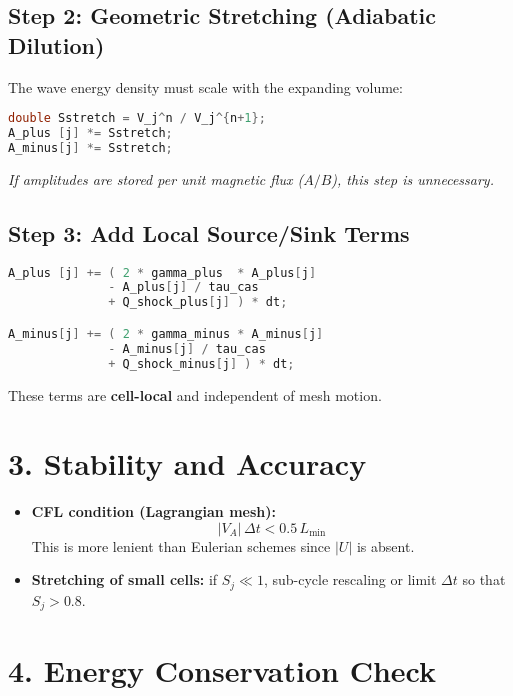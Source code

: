 \subsection*{Step 2: Geometric Stretching (Adiabatic Dilution)}

The wave energy density must scale with the expanding volume:
\begin{lstlisting}[language=C++,basicstyle=\ttfamily\footnotesize]
double Sstretch = V_j^n / V_j^{n+1};
A_plus [j] *= Sstretch;
A_minus[j] *= Sstretch;
\end{lstlisting}

\emph{If amplitudes are stored per unit magnetic flux ($A/B$), this step is unnecessary.}

\subsection*{Step 3: Add Local Source/Sink Terms}

\begin{lstlisting}[language=C++,basicstyle=\ttfamily\footnotesize]
A_plus [j] += ( 2 * gamma_plus  * A_plus[j]
              - A_plus[j] / tau_cas
              + Q_shock_plus[j] ) * dt;

A_minus[j] += ( 2 * gamma_minus * A_minus[j]
              - A_minus[j] / tau_cas
              + Q_shock_minus[j] ) * dt;
\end{lstlisting}

These terms are \textbf{cell-local} and independent of mesh motion.

\section*{3. Stability and Accuracy}

\begin{itemize}
    \item \textbf{CFL condition (Lagrangian mesh):}
    \[
    |V_A|\,\Delta t < 0.5\,L_{\min}
    \]
    This is more lenient than Eulerian schemes since $|U|$ is absent.
    \item \textbf{Stretching of small cells:} if $S_j \ll 1$, sub-cycle rescaling or limit $\Delta t$ so that $S_j > 0.8$.
\end{itemize}

\section*{4. Energy Conservation Check}

